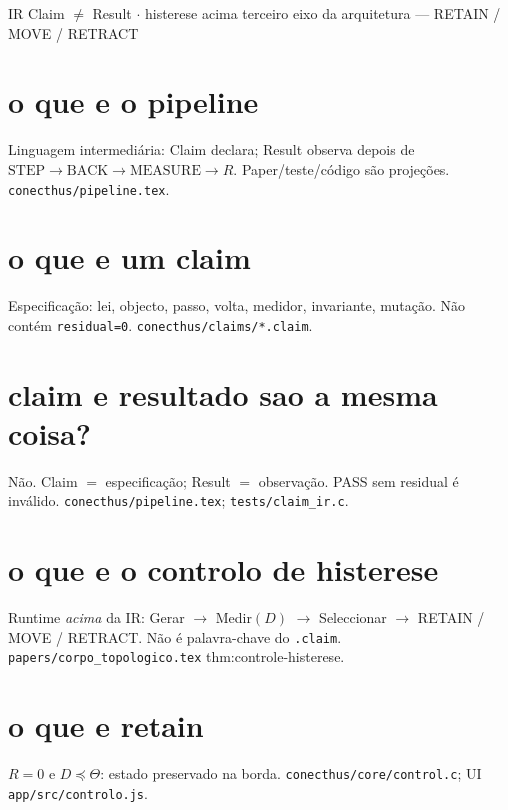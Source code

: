 \documentclass[11pt,a4paper]{article}
\newcommand{\code}[1]{\texttt{\small #1}}
\begin{document}
       {IR Claim $\neq$ Result $\cdot$ histerese acima}
       {terceiro eixo da arquitetura --- RETAIN / MOVE / RETRACT}
\maketitle
\begin{abstract}
Pares curtos da IR do pipeline e do Controlo de Histerese.
Especificação: \code{conecthus/pipeline.tex}; arquitetura
\code{corpus/docs/arquitetura.tex} \S pipeline; Peano
\code{thm:controle-histerese}. UI: \code{app/src/controlo.js}.
\end{abstract}

\section{o que e o pipeline}
Linguagem intermediária: \textsf{Claim} declara; \textsf{Result} observa
depois de $\mathrm{STEP}\to\mathrm{BACK}\to\mathrm{MEASURE}\to R$.
Paper/teste/código são projeções. \code{conecthus/pipeline.tex}.

\section{o que e um claim}
Especificação: lei, objecto, passo, volta, medidor, invariante, mutação.
Não contém \code{residual=0}. \code{conecthus/claims/*.claim}.

\section{claim e resultado sao a mesma coisa?}
Não. Claim $=$ especificação; Result $=$ observação. PASS sem residual é
inválido. \code{conecthus/pipeline.tex}; \code{tests/claim\_ir.c}.

\section{o que e o controlo de histerese}
Runtime \emph{acima} da IR: Gerar $\to$ Medir$(D)$ $\to$ Seleccionar $\to$
RETAIN / MOVE / RETRACT. Não é palavra-chave do \code{.claim}.
\code{papers/corpo\_topologico.tex} thm:controle-histerese.

\section{o que e retain}
$R=0$ e $D\preceq\Theta$: estado preservado na borda.
\code{conecthus/core/control.c}; UI \code{app/src/controlo.js}.
\end{document}
